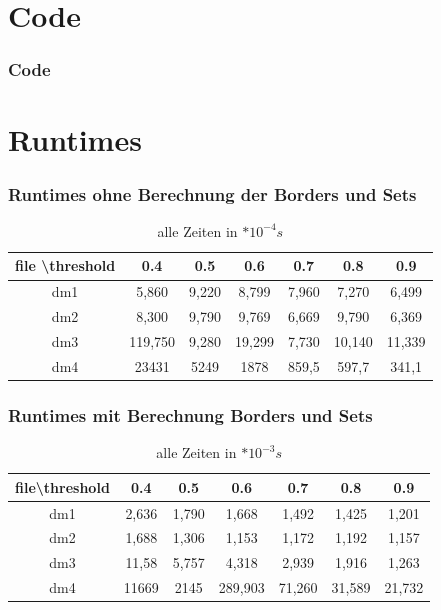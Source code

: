 \documentclass{beamer}
\begin{document}
\section{Code}
\begin{frame} %
	\frametitle{Code} %
\end{frame}






\section{Runtimes}
\begin{frame} %
	\frametitle{Runtimes ohne Berechnung der Borders und Sets} %
	\begin{table}    
		\centering    
		\begin{tabular}{|c|c|c|c|c|c|c|}    
			\hline file \textbackslash threshold& 0.4& 0.5& 0.6& 0.7& 0.8& 0.9\\
			\hline dm1& 5,860& 9,220& 8,799& 7,960& 7,270& 6,499\\
			\hline dm2& 8,300& 9,790& 9,769& 6,669& 9,790& 6,369\\
			\hline dm3& 119,750& 9,280& 19,299& 7,730& 10,140& 11,339\\
			\hline dm4& 23431& 5249& 1878& 859,5& 597,7& 341,1\\
			\hline 
		\end{tabular}    
		\caption{alle Zeiten in $*10^{-4}s$}    
	\end{table}    
\end{frame}

\begin{frame} %
	\frametitle{Runtimes mit Berechnung Borders und Sets} %
	\begin{table}    
		\centering    
		\begin{tabular}{|c|c|c|c|c|c|c|}    
			\hline file\textbackslash threshold& 0.4& 0.5& 0.6& 0.7& 0.8& 0.9 \\
			\hline dm1& 2,636& 1,790& 1,668& 1,492& 1,425& 1,201\\
			\hline dm2& 1,688& 1,306& 1,153& 1,172& 1,192& 1,157\\
			\hline dm3& 11,58& 5,757& 4,318& 2,939& 1,916& 1,263\\
			\hline dm4& 11669 & 2145& 289,903& 71,260& 31,589& 21,732\\
			\hline 
		\end{tabular}    
		\caption{alle Zeiten in $*10^{-3}s$}    
	\end{table}    
\end{frame}
\end{document}
